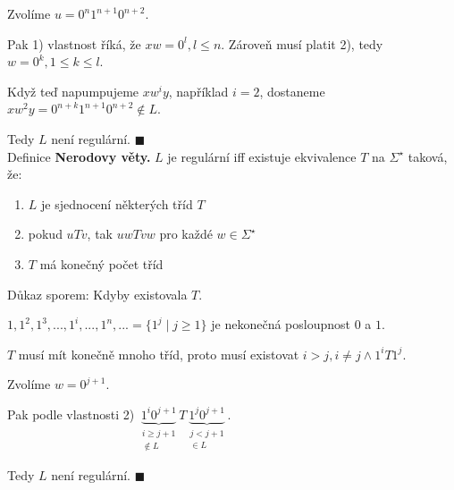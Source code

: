 Zvolíme $u = 0^n 1^{n+1} 0^{n+2}$.

Pak 1) vlastnost říká, že $xw = 0^l, l \leq n$. Zároveň musí platit 2), tedy $w = 0^k, 1 \leq k \leq l$.

Když teď napumpujeme $xw^i y$, například $i=2$, dostaneme $xw^2 y = 0^{n+k} 1^{n+1} 0^{n+2} \not\in L$.

Tedy $L$ není regulární. $\blacksquare$\\

\noindent
Definice \textbf{Nerodovy věty.} $L$ je regulární iff existuje ekvivalence $T$ na $\Sigma^\star$ taková, že:
\begin{enumerate}[1), noitemsep]
    \item $L$ je sjednocení některých tříd $T$
    \item pokud $uTv$, tak $uwTvw$ pro každé $w \in \Sigma^\star$
    \item $T$ má konečný počet tříd
\end{enumerate}
Důkaz sporem:
Kdyby existovala $T$.

$1, 1^2, 1^3, ..., 1^i, ..., 1^n, ... = \{1^j \mid j \geq 1\}$ je nekonečná posloupnost $0$ a $1$. 

$T$ musí mít konečně mnoho tříd, proto musí existovat $i > j, i \not= j \land 1^i T 1^j$.

Zvolíme $w = 0^{j + 1}$.

Pak podle vlastnosti 2) $\underbrace{1^i 0^{j+1}}_{\substack{i \geq j+1 \\ \not\in L}} T 
\underbrace{1^j 0^{j+1}}_{\substack{j < j+1 \\\in L }}$.

Tedy $L$ není regulární. $\blacksquare$